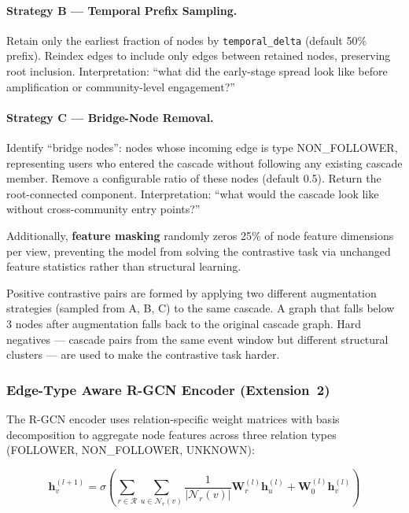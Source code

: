 \documentclass[12pt, a4paper]{article}
\begin{document}
\paragraph{Strategy B --- Temporal Prefix Sampling.} Retain only the earliest fraction of nodes by \texttt{temporal\_delta} (default 50\% prefix). Reindex edges to include only edges between retained nodes, preserving root inclusion. Interpretation: ``what did the early-stage spread look like before amplification or community-level engagement?''

\paragraph{Strategy C --- Bridge-Node Removal.} Identify ``bridge nodes'': nodes whose incoming edge is type NON\_FOLLOWER, representing users who entered the cascade without following any existing cascade member. Remove a configurable ratio of these nodes (default 0.5). Return the root-connected component. Interpretation: ``what would the cascade look like without cross-community entry points?''

Additionally, \textbf{feature masking} randomly zeros 25\% of node feature dimensions per view, preventing the model from solving the contrastive task via unchanged feature statistics rather than structural learning.

Positive contrastive pairs are formed by applying two different augmentation strategies (sampled from A, B, C) to the same cascade. A graph that falls below 3 nodes after augmentation falls back to the original cascade graph. Hard negatives --- cascade pairs from the same event window but different structural clusters --- are used to make the contrastive task harder.

\subsubsection{Edge-Type Aware R-GCN Encoder (Extension~2)}

The R-GCN encoder \citep{schlichtkrull2018rgcn} uses relation-specific weight matrices with basis decomposition to aggregate node features across three relation types (FOLLOWER, NON\_FOLLOWER, UNKNOWN):

\begin{equation}
\mathbf{h}_v^{(l+1)} = \sigma\!\left(\sum_{r \in \mathcal{R}} \sum_{u \in \mathcal{N}_r(v)} \frac{1}{|\mathcal{N}_r(v)|} \mathbf{W}_r^{(l)} \mathbf{h}_u^{(l)} + \mathbf{W}_0^{(l)} \mathbf{h}_v^{(l)}\right)
\end{equation}
\end{document}
